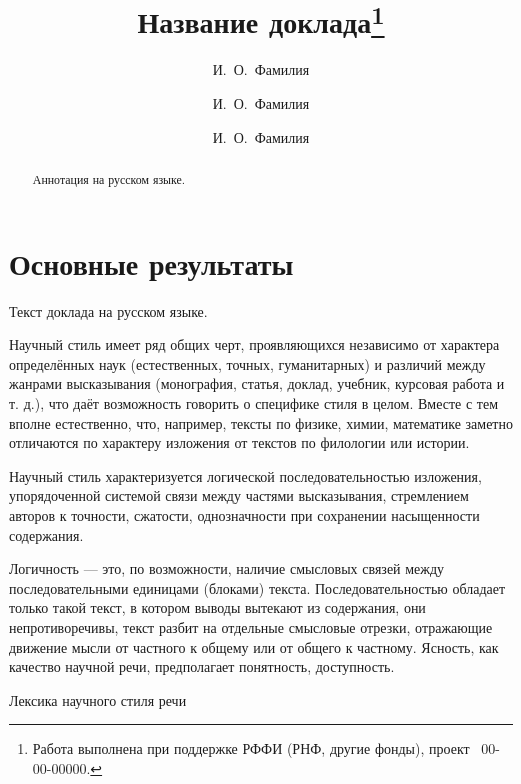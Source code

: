\documentclass[12pt]{llncs}
\begin{document}
\title{Название доклада\thanks{Работа выполнена при поддержке РФФИ (РНФ, другие фонды), проект \textnumero~00-00-00000.}}
\author{И.~О.~Фамилия
  \and
  И.~О.~Фамилия
  \and
  И.~О.~Фамилия
} %

\maketitle

\begin{abstract}
Аннотация на русском языке.

\end{abstract}

\section{Основные результаты} %

Текст доклада на русском языке.

Научный стиль имеет ряд общих черт, проявляющихся независимо от характера определённых наук (естественных, точных, гуманитарных) и различий между жанрами высказывания (монография, статья, доклад, учебник, курсовая работа и т. д.), что даёт возможность говорить о специфике стиля в целом. Вместе с тем вполне естественно, что, например, тексты по физике, химии, математике заметно отличаются по характеру изложения от текстов по филологии или истории.

Научный стиль характеризуется логической последовательностью изложения, упорядоченной системой связи между частями высказывания, стремлением авторов к точности, сжатости, однозначности при сохранении насыщенности содержания.

    Логичность — это, по возможности, наличие смысловых связей между последовательными единицами (блоками) текста.
    Последовательностью обладает только такой текст, в котором выводы вытекают из содержания, они непротиворечивы, текст разбит на отдельные смысловые отрезки, отражающие движение мысли от частного к общему или от общего к частному.
    Ясность, как качество научной речи, предполагает понятность, доступность.

Лексика научного стиля речи
\end{document}
